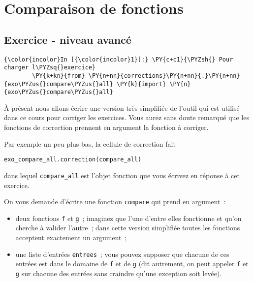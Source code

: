     
    
    
    

    

    \hypertarget{comparaison-de-fonctions}{%
\section{Comparaison de fonctions}\label{comparaison-de-fonctions}}

    \hypertarget{exercice---niveau-avancuxe9}{%
\subsection{Exercice - niveau
avancé}\label{exercice---niveau-avancuxe9}}

    \begin{Verbatim}[commandchars=\\\{\}]
{\color{incolor}In [{\color{incolor}1}]:} \PY{c+c1}{\PYZsh{} Pour charger l\PYZsq{}exercice}
        \PY{k+kn}{from} \PY{n+nn}{corrections}\PY{n+nn}{.}\PY{n+nn}{exo\PYZus{}compare\PYZus{}all} \PY{k}{import} \PY{n}{exo\PYZus{}compare\PYZus{}all}
\end{Verbatim}


    À présent nous allons écrire une version très simplifiée de l'outil qui
est utilisé dans ce cours pour corriger les exercices. Vous aurez sans
doute remarqué que les fonctions de correction prennent en argument la
fonction à corriger.

Par exemple un peu plus bas, la cellule de correction fait

\begin{verbatim}
exo_compare_all.correction(compare_all)  
\end{verbatim}

dans lequel \texttt{compare\_all} est l'objet fonction que vous écrivez
en réponse à cet exercice.

    On vous demande d'écrire une fonction \texttt{compare} qui prend en
argument~:

\begin{itemize}
\tightlist
\item
  deux fonctions \texttt{f} et \texttt{g}~; imaginez que l'une d'entre
  elles fonctionne et qu'on cherche à valider l'autre~; dans cette
  version simplifiée toutes les fonctions acceptent exactement un
  argument~;
\item
  une liste d'entrées \texttt{entrees}~; vous pouvez supposer que
  chacune de ces entrées est dans le domaine de \texttt{f} et de
  \texttt{g} (dit autrement, on peut appeler \texttt{f} et \texttt{g}
  sur chacune des entrées sans craindre qu'une exception soit levée).
\end{itemize}

